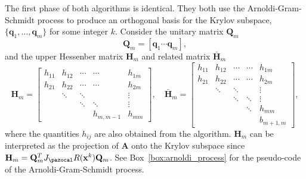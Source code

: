 The first phase of both algorithms is identical.
They both use the Arnoldi-Gram-Schmidt process to produce an orthogonal basis for the Krylov subspace, \(\{\mathbf q_1, \dots, \mathbf q_m\}\) for some integer \(k\).
Consider the unitary matrix \(\mathbf Q_m\)
\begin{equation}
  \mathbf Q_m = [\mathbf q_1 \cdots \mathbf q_m],
\end{equation}
and the upper Hessenber matrix \(\mathbf H_m\) and related matrix \(\bar{\mathbf H}_m\)
\begin{equation}
 \mathbf H_{m}=\left[\begin{array}{ccccc}
h_{11} & h_{12} & \cdots & \cdots & h_{1m} \\
h_{21} & h_{22} & \cdots & \cdots & h_{2m} \\
& \ddots & \ddots & & \vdots \\
& & \ddots & \ddots & \vdots \\
& & & h_{m,m-1} & h_{mm}
\end{array}\right] , \quad
  \bar{\mathbf H}_{m}=\left[\begin{array}{ccccc}
h_{11} & h_{12} & \cdots & \cdots & h_{1 m} \\
h_{21} & h_{22} & \cdots & \cdots & h_{2 m} \\
& \ddots & \ddots & & \vdots \\
& & \ddots & \ddots & \vdots \\
& & & \ddots & h_{m m} \\
& & & & b_{m+1, m}
\end{array}\right],
\end{equation}
where the quantities \(h_{ij}\) are also obtained from the algorithm.
\(\mathbf H_m\) can be interpreted as the projection of \(\mathbf A\) onto the Krylov subspace since \(\mathbf H_m = \mathbf Q_m^T J_\pazocal R(\mathbf x^k) \mathbf Q_m\).
See Box~\ref{box:arnoldi_process} for the pseudo-code of the Arnoldi-Gram-Schmidt process.

